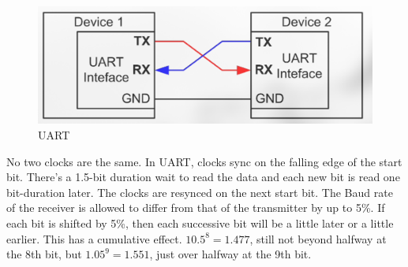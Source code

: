 \begin{figure}
    \includegraphics{images/uart.png}
    \caption{UART}
    \label{fig:uart}
\end{figure}

No two clocks are the same.
In UART, clocks sync on the
falling edge of the start bit.
There's a 1.5-bit duration wait
to read the data and each new
bit is read one bit-duration
later. The clocks are resynced
on the next start bit. The
Baud rate of the receiver is
allowed to differ from that of
the transmitter by up to
5\%. If each bit is shifted by 5\%,
then each successive bit will be
a little later or a little
earlier. This has a cumulative
effect. $10.5^8 = 1.477$,
still not beyond halfway at
the 8th bit, but $1.05^9 = 1.551$,
just over halfway at the 9th bit.
